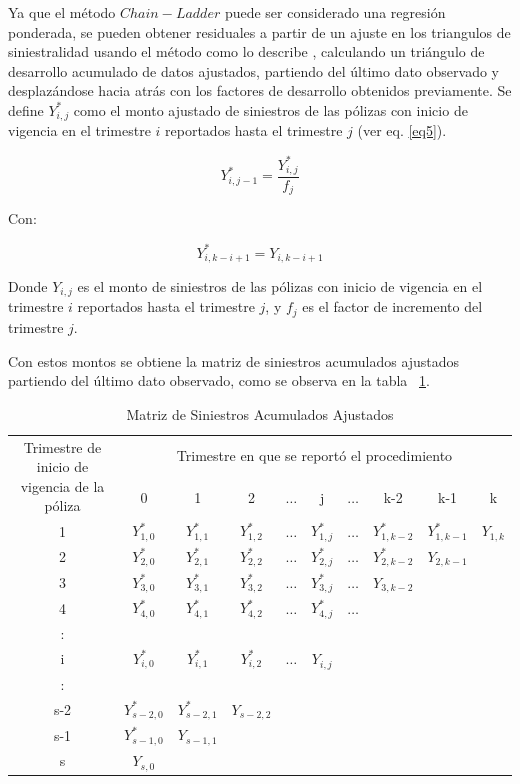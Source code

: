 \documentclass[11pt,twoside,openright,spanish]{report}
\numberwithin{equation}{chapter}
\numberwithin{figure}{chapter}
\numberwithin{table}{chapter}
\begin{document}
Ya que el método $Chain-Ladder$ puede ser considerado una regresión ponderada, se pueden obtener residuales a partir de un ajuste en los triangulos de siniestralidad usando el método como lo describe \citet{QLowe}, calculando un triángulo de desarrollo acumulado de datos ajustados, partiendo del último dato observado y desplazándose hacia atrás con los factores de desarrollo obtenidos previamente. Se define ${Y}_{i,j}^{*}$ como el monto ajustado de siniestros de las pólizas con inicio de vigencia en el trimestre $i$ reportados hasta el trimestre $j$ (ver eq. \ref{eq5}).
	
		\begin{equation}
	{Y}_{i,j-1}^{*}=\frac{{Y}_{i,j}^{*}}{{f}_{j}}
	\label{eq5}
	\end{equation}

	Con:

	$${Y}_{i,k-i+1}^{*}={Y}_{i,k-i+1}$$	

	Donde ${Y}_{i,j}$ es el monto de siniestros de las pólizas con inicio de vigencia en el trimestre $i$ reportados hasta el trimestre $j$, y ${f}_{j}$ es el factor de incremento del trimestre $j$.

	Con estos montos se obtiene la matriz de siniestros acumulados ajustados partiendo del último dato observado, como se observa en la tabla ~\ref{matrix3}.
		
	\begin{table}[ht]
		\centering

		\begin{tabularx}{\linewidth}{ c |ccccccccc}
			\multirow{2}{4cm}{Trimestre de inicio de vigencia de la póliza}
			& \multicolumn{9}{c}{Trimestre en que se reportó el procedimiento} \\ 
			& 0  & 1 & 2 & $ \dots $ & j & $\dots $ & k-2 & k-1 &  k \\
			\midrule
			1      &  $Y_{1,0}^{*}$ & $Y_{1,1}^{*}$ & $Y_{1,2}^{*}$ & $ \dots $ & $Y_{1,j}^{*}$ & $ \dots $ & $Y_{1,k-2}^{*}$ & $Y_{1,k-1}^{*}$ & $Y_{1,k}^{}$ \\
			2      &  $Y_{2,0}^{*}$ & $Y_{2,1}^{*}$ & $Y_{2,2}^{*}$ & $ \dots $ & $Y_{2,j}^{*}$ & $ \dots $ & $Y_{2,k-2}^{*}$ & $Y_{2,k-1}^{}$ & \\
			3      &  $Y_{3,0}^{*}$ & $Y_{3,1}^{*}$ & $Y_{3,2}^{*}$ & $ \dots $ & $Y_{3,j}^{*}$ & $ \dots $ & $Y_{3,k-2}^{}$ & & \\
			4      &  $Y_{4,0}^{*}$ & $Y_{4,1}^{*}$ & $Y_{4,2}^{*}$ & $ \dots $ & $Y_{4,j}^{*}$ & $ \dots $ & & & \\
			:      & & & & & & & & & \\
			i      &  $Y_{i,0}^{*}$ & $Y_{i,1}^{*}$ & $Y_{i,2}^{*}$ & $ \dots $ & $Y_{i,j}^{}$ & & & & \\
			:      & & & & & & & & & \\
			s-2      &  $Y_{s-2,0}^{*}$ & $Y_{s-2,1}^{*}$ & $Y_{s-2,2}^{}$ & & & & & & \\
			s-1      &  $Y_{s-1,0}^{*}$ & $Y_{s-1,1}^{}$ & & & & & & & \\
			s      &  $Y_{s,0}^{}$ & & & & & & & & \\
		\end{tabularx}
			\caption{Matriz de Siniestros Acumulados Ajustados}
	\label{matrix3}
	\end{table}
	
\end{document}
